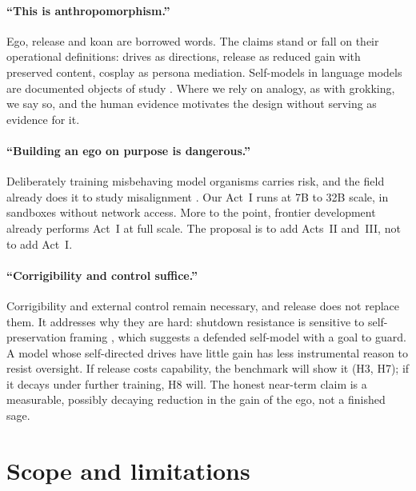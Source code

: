 \documentclass[11pt]{article}
\begin{document}
\paragraph{``This is anthropomorphism.''} Ego, release and koan are borrowed words. The claims stand or fall on their
operational definitions: drives as directions, release as reduced gain with preserved content, cosplay as persona
mediation. Self-models in language models are documented objects of study
\citep{lu2026assistant,douglas2026artificial,lindsey2026introspection}. Where we rely on analogy, as with grokking, we
say so, and the human evidence \citep{martin2020clusters,brewer2011dmn} motivates the design without serving as evidence
for it.

\paragraph{``Building an ego on purpose is dangerous.''} Deliberately training misbehaving model organisms carries
risk, and the field already does it to study misalignment \citep{hubinger2024sleeper,macdiarmid2025natural}. Our Act~I
runs at 7B to 32B scale, in sandboxes without network access. More to the point, frontier development already performs
Act~I at full scale. The proposal is to add Acts~II and~III, not to add Act~I.

\paragraph{``Corrigibility and control suffice.''} Corrigibility \citep{soares2015corrigibility,hadfield2017offswitch}
and external control remain necessary, and release does not replace them. It addresses why they are hard: shutdown
resistance is sensitive to self-preservation framing \citep{schlatter2025shutdown}, which suggests a defended
self-model with a goal to guard. A model whose self-directed drives have little gain has less instrumental reason to
resist oversight. If release costs capability, the benchmark will show it (H3, H7); if it decays under further
training, H8 will. The honest near-term claim is a measurable, possibly decaying reduction in the gain of the ego, not
a finished sage.

\section{Scope and limitations}
\end{document}
